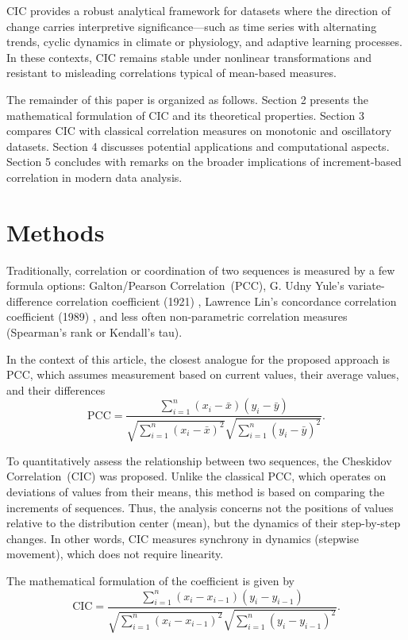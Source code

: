 \documentclass[qe,nameyear,draft]{econsocart}
\newcommand{\cic}{\text{CIC}}
\newcommand{\cicFull}{\textnormal{Cheskidov Correlation}}
\newcommand{\pcc}{\text{PCC}}
\newcommand{\pccFull}{\textnormal{Galton/Pearson Correlation}}
\begin{document}
$\cic$ provides a robust analytical framework for datasets where the direction of change carries interpretive significance—such as time series with alternating trends, cyclic dynamics in climate or physiology, and adaptive learning processes. In these contexts, $\cic$ remains stable under nonlinear transformations and resistant to misleading correlations typical of mean-based measures.

The remainder of this paper is organized as follows. Section 2 presents the mathematical formulation of $\cic$ and its theoretical properties. Section 3 compares $\cic$ with classical correlation measures on monotonic and oscillatory datasets. Section 4 discusses potential applications and computational aspects. Section 5 concludes with remarks on the broader implications of increment-based correlation in modern data analysis.


\section{Methods}

Traditionally, correlation or coordination of two sequences is measured by a few formula options: \pccFull\ ($\pcc$), G. Udny Yule’s variate-difference correlation coefficient (1921) \cite{r1}, Lawrence Lin’s concordance correlation coefficient (1989) \cite{r2}, and less often non-parametric correlation measures (Spearman’s rank or Kendall’s tau).

In the context of this article, the closest analogue for the proposed approach is $\pcc$, which assumes measurement based on current values, their average values, and their differences
\begin{equation}
\text{$\pcc$} = \frac{\sum_{i=1}^n (x_i - \bar{x})(y_i - \bar{y})}{\sqrt{\sum_{i=1}^n (x_i - \bar{x})^2}\sqrt{\sum_{i=1}^n (y_i - \bar{y})^2}}.
\end{equation}

To quantitatively assess the relationship between two sequences, the \cicFull\ ($\cic$) was proposed. Unlike the classical $\pcc$, which operates on deviations of values from their means, this method is based on comparing the increments of sequences. Thus, the analysis concerns not the positions of values relative to the distribution center (mean), but the dynamics of their step-by-step changes. In other words, $\cic$ measures synchrony in dynamics (stepwise movement), which does not require linearity.

The mathematical formulation of the coefficient is given by
\begin{equation}
\text{$\cic$} = \frac{\sum_{i=1}^n (x_i - x_{i-1})(y_i - y_{i-1})}{\sqrt{\sum_{i=1}^n (x_i - x_{i-1})^2} \sqrt{\sum_{i=1}^n (y_i - y_{i-1})^2}}.
\end{equation}
\end{document}

